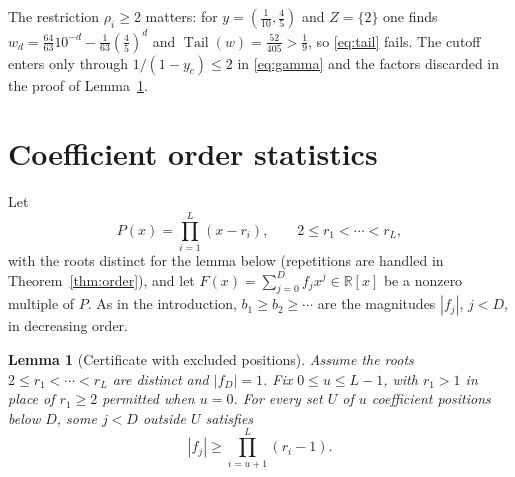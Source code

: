 \documentclass[11pt]{article}
\newtheorem{lemma}[theorem]{Lemma}
\newcommand{\R}{\mathbb R}
\DeclareMathOperator{\Tail}{Tail}
\begin{document}
The restriction $\rho_i\ge2$ matters: for $y=(\frac1{10},\frac45)$ and
$Z=\{2\}$ one finds $w_d=\frac{64}{63}10^{-d}-\frac1{63}(\frac45)^d$ and
$\Tail(w)=\frac{52}{405}>\frac19$, so \eqref{eq:tail} fails.  The cutoff
enters only through $1/(1-y_c)\le2$ in \eqref{eq:gamma} and the factors
discarded in the proof of Lemma~\ref{lem:slack}.

\section{Coefficient order statistics}

Let
\[
 P(x)=\prod_{i=1}^L(x-r_i),\qquad 2\le r_1<\cdots<r_L,
\]
with the roots distinct for the lemma below (repetitions are handled in
Theorem~\ref{thm:order}), and let $F(x)=\sum_{j=0}^Df_jx^j\in\R[x]$ be a
nonzero multiple of $P$.  As in the introduction, $b_1\ge b_2\ge\cdots$ are
the magnitudes $|f_j|$, $j<D$, in decreasing order.

\begin{lemma}[Certificate with excluded positions]\label{lem:slack}
Assume the roots $2\le r_1<\cdots<r_L$ are distinct and $|f_D|=1$.  Fix $0\le u\le L-1$, with $r_1>1$
in place of $r_1\ge2$ permitted when $u=0$.  For every set $U$ of $u$
coefficient positions below $D$, some $j<D$ outside $U$ satisfies
\[
 |f_j|\ge\prod_{i=u+1}^L(r_i-1).
\]
\end{lemma}
\end{document}
